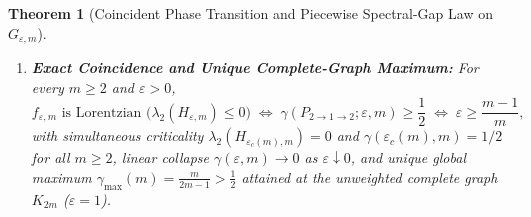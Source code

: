 \documentclass[11pt,a4paper]{article}
\newtheorem{theorem}{Theorem}[section]
\theoremstyle{definition}
\theoremstyle{remark}
\begin{document}
\begin{theorem}[Coincident Phase Transition and Piecewise Spectral-Gap Law on $G_{\varepsilon,m}$]
\begin{enumerate}[leftmargin=1.8em,itemsep=2pt]
\begin{equation}
    \gamma(P_{2\to 1\to 2}; \varepsilon, m) =
    \begin{cases}
      \dfrac{m\varepsilon}{(m-1) + m\varepsilon}, & 0 < \varepsilon \le 1, \\[9pt]
      \dfrac{1}{2} + \dfrac{1}{2\bigl((m-1) + m\varepsilon\bigr)}, & \varepsilon \ge 1.
    \end{cases}
  \end{equation}
  \item \textbf{Exact Coincidence and Unique Complete-Graph Maximum:} For every $m \ge 2$ and $\varepsilon > 0$,
  \begin{equation}
    f_{\varepsilon,m} \text{ is Lorentzian } \bigl(\lambda_2(H_{\varepsilon,m}) \le 0\bigr)
    \;\Longleftrightarrow\;
    \gamma(P_{2\to 1\to 2}; \varepsilon, m) \ge \frac{1}{2}
    \;\Longleftrightarrow\;
    \varepsilon \ge \frac{m-1}{m},
  \end{equation}
  with simultaneous criticality $\lambda_2(H_{\varepsilon_c(m),m}) = 0$ and $\gamma(\varepsilon_c(m), m) = 1/2$ for all $m \ge 2$, linear collapse $\gamma(\varepsilon, m) \to 0$ as $\varepsilon \downarrow 0$, and unique global maximum $\gamma_{\max}(m) = \frac{m}{2m-1} > \frac{1}{2}$ attained at the unweighted complete graph $K_{2m}$ ($\varepsilon = 1$).
\end{enumerate}
\end{theorem}
\end{document}
